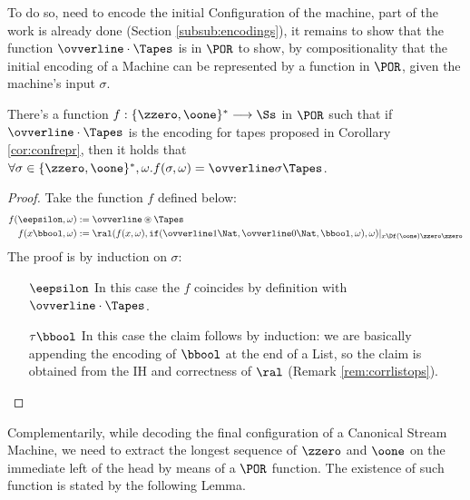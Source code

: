 \begin{conditional}{\notappendix}
    To do so, need to encode the
    initial Configuration of the machine, part of the work is already
    done (Section \ref{subsub:encodings}), it remains to show
    that the function $\ovverline \cdot \Tapes$ is in $\POR$
    to show, by compositionality that the initial encoding of a
    Machine can be represented by a function in $\POR$,
    given the machine's input $\sigma$.

    \begin{lemma}
      \label{lemma:tencinpor}
      There's a function $f :
      \{\zzero, \oone\}^*\longrightarrow \Ss$ in $\POR$
      such that if $\ovverline \cdot \Tapes$ is the encoding for tapes
      proposed in Corollary \ref{cor:confrepr}, then it holds that
      $\forall \sigma \in \{\zzero, \oone\}^*, \omega. f(\sigma, \omega)=
      \ovverline \sigma\Tapes$.
    \end{lemma}
    \begin{proof}
      Take the function $f$ defined below:
      \begin{align*}
        f(\eepsilon, \omega) &:= \ovverline \circledast\Tapes\\
        f(x\bbool, \omega) &:= \ral(f(x, \omega),\mathtt{if}(\ovverline 1 \Nat,\ovverline 0 \Nat, \bbool, \omega), \omega)|_{x\Df(\oone)\zzero\zzero}
      \end{align*}
      The proof is by induction on $\sigma$:
      \begin{itemize}
        \item[$\eepsilon$] In this case the $f$ coincides
        by definition with $\ovverline \cdot\Tapes$.
        \item[$\tau \bbool$] In this case the claim follows by induction:
        we are basically appending the encoding of $\bbool$ at the end of a List,
        so the claim is obtained from the IH and correctness
        of $\ral$ (Remark \ref{rem:corrlistops}).
      \end{itemize}
    \end{proof}

    Complementarily, while decoding the final configuration of a Canonical Stream
    Machine, we need to extract the longest sequence of $\zzero$ and $\oone$
    on the immediate left of the head by means of a $\POR$ function.
    The existence of such function is stated by the following Lemma.


\end{conditional}
